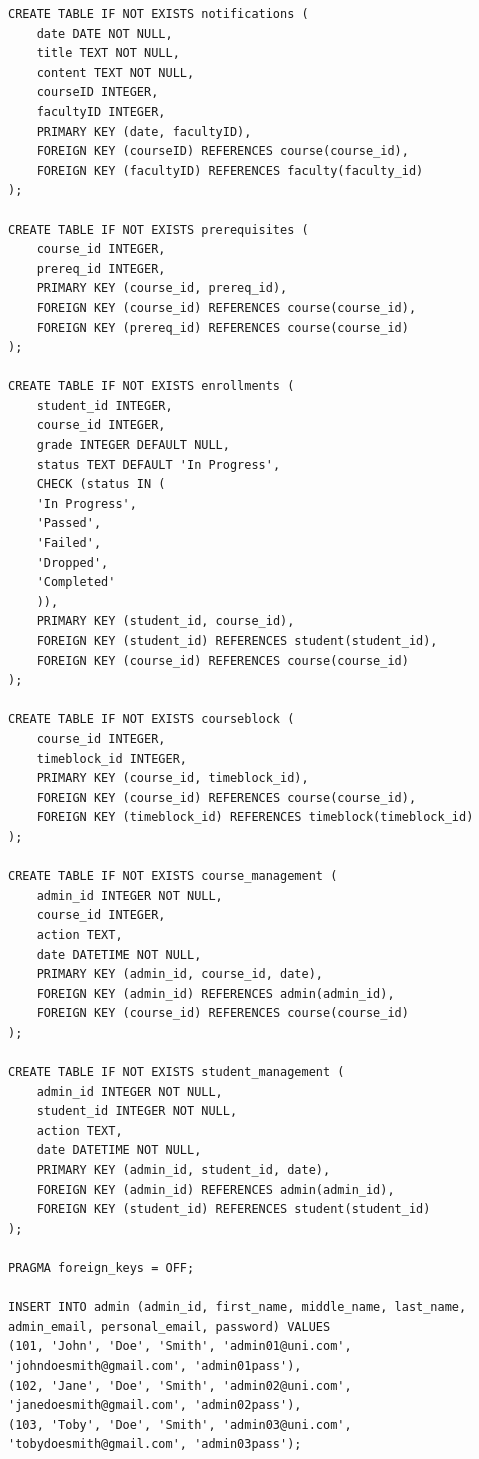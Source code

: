 \documentclass{report}
\begin{document}
\begin{lstlisting}
CREATE TABLE IF NOT EXISTS notifications (
    date DATE NOT NULL,
    title TEXT NOT NULL,
    content TEXT NOT NULL,
    courseID INTEGER,
    facultyID INTEGER,
    PRIMARY KEY (date, facultyID),
    FOREIGN KEY (courseID) REFERENCES course(course_id),
    FOREIGN KEY (facultyID) REFERENCES faculty(faculty_id)
);

CREATE TABLE IF NOT EXISTS prerequisites (
    course_id INTEGER,
    prereq_id INTEGER,
    PRIMARY KEY (course_id, prereq_id),
    FOREIGN KEY (course_id) REFERENCES course(course_id),
    FOREIGN KEY (prereq_id) REFERENCES course(course_id)
);

CREATE TABLE IF NOT EXISTS enrollments (
    student_id INTEGER,
    course_id INTEGER,
    grade INTEGER DEFAULT NULL,
    status TEXT DEFAULT 'In Progress',
    CHECK (status IN (
    'In Progress',
    'Passed',
    'Failed',
    'Dropped',
    'Completed'
    )),
    PRIMARY KEY (student_id, course_id),
    FOREIGN KEY (student_id) REFERENCES student(student_id),
    FOREIGN KEY (course_id) REFERENCES course(course_id)
);

CREATE TABLE IF NOT EXISTS courseblock (
    course_id INTEGER,
    timeblock_id INTEGER,
    PRIMARY KEY (course_id, timeblock_id),
    FOREIGN KEY (course_id) REFERENCES course(course_id),
    FOREIGN KEY (timeblock_id) REFERENCES timeblock(timeblock_id)
);

CREATE TABLE IF NOT EXISTS course_management (
    admin_id INTEGER NOT NULL,
    course_id INTEGER,
    action TEXT,
    date DATETIME NOT NULL,
    PRIMARY KEY (admin_id, course_id, date),
    FOREIGN KEY (admin_id) REFERENCES admin(admin_id),
    FOREIGN KEY (course_id) REFERENCES course(course_id)
);

CREATE TABLE IF NOT EXISTS student_management (
    admin_id INTEGER NOT NULL,
    student_id INTEGER NOT NULL,
    action TEXT,
    date DATETIME NOT NULL,
    PRIMARY KEY (admin_id, student_id, date),
    FOREIGN KEY (admin_id) REFERENCES admin(admin_id),
    FOREIGN KEY (student_id) REFERENCES student(student_id)
);

PRAGMA foreign_keys = OFF;

INSERT INTO admin (admin_id, first_name, middle_name, last_name, admin_email, personal_email, password) VALUES
(101, 'John', 'Doe', 'Smith', 'admin01@uni.com', 'johndoesmith@gmail.com', 'admin01pass'),
(102, 'Jane', 'Doe', 'Smith', 'admin02@uni.com', 'janedoesmith@gmail.com', 'admin02pass'),
(103, 'Toby', 'Doe', 'Smith', 'admin03@uni.com', 'tobydoesmith@gmail.com', 'admin03pass');


\end{lstlisting}
\end{document}
